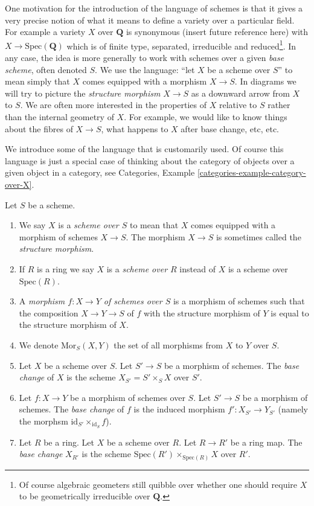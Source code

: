 \noindent
One motivation for the introduction of the language of schemes
is that it gives a very precise notion of what it means to
define a variety over a particular field. For example a variety
$X$ over $\mathbf{Q}$ is synonymous (insert future reference here)
with $X \to \text{Spec}(\mathbf{Q})$ which is of finite type,
separated, irreducible and reduced\footnote{Of course algebraic
geometers still quibble over whether one should require $X$ to be
geometrically irreducible over $\mathbf{Q}$.}. In any case, the idea
is more generally to work with schemes over a given {\it base scheme},
often denoted $S$. We use the language: ``let $X$ be a scheme over $S$''
to mean simply that $X$ comes equipped with a morphism $X \to S$.
In diagrams we will try to picture the {\it structure morphism}
$X \to S$ as a downward arrow from $X$ to $S$.
We are often more interested in the properties of $X$ relative
to $S$ rather than the internal geometry of $X$.
For example, we would like to know things about the fibres of $X \to S$,
what happens to $X$ after base change, etc, etc.

\medskip\noindent
We introduce some of the language that is customarily used.
Of course this language is just a special case of thinking
about the category of objects over a given object in a category,
see Categories, Example \ref{categories-example-category-over-X}.

\begin{definition}
\label{definition-base-change}
Let $S$ be a scheme.
\begin{enumerate}
\item We say $X$ is a {\it scheme over $S$} to mean that $X$
comes equipped with a morphism of schemes $X \to S$.
The morphism $X \to S$ is sometimes called the
{\it structure morphism}.
\item If $R$ is a ring we say
$X$ is a {\it scheme over $R$} instead of
$X$ is a scheme over $\text{Spec}(R)$.
\item A {\it morphism $f : X \to Y$ of schemes over $S$}
is a morphism of schemes such that the composition
$X \to Y \to S$ of $f$ with the structure morphism of $Y$ is
equal to the structure morphism of $X$.
\item We denote $\text{Mor}_S(X, Y)$ the set of all morphisms
from $X$ to $Y$ over $S$.
\item Let $X$ be a scheme over $S$. Let $S' \to S$ be a
morphism of schemes. The {\it base change} of $X$
is the scheme $X_{S'} = S' \times_S X$ over $S'$.
\item Let $f : X \to Y$ be a morphism of schemes over $S$. Let $S' \to S$
be a morphism of schemes. The {\it base change} of $f$ is
the induced morphism $f' : X_{S'} \to Y_{S'}$ (namely the
morphsm $\text{id}_{S'} \times_{\text{id}_S} f$).
\item Let $R$ be a ring. Let $X$ be a scheme over $R$.
Let $R \to R'$ be a ring map. The {\it base change} $X_{R'}$
is the scheme $\text{Spec}(R') \times_{\text{Spec}(R)} X$
over $R'$.
\end{enumerate}
\end{definition}

